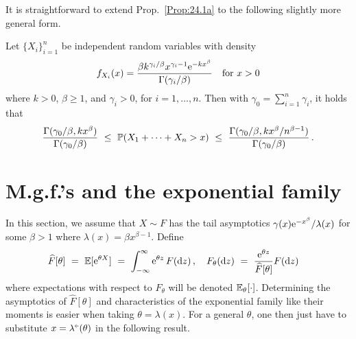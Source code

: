 It is straightforward to extend Prop.~\ref{Prop:24.1a} to the following slightly more general form.
\begin{proposition}\label{Prop:24.1b} Let $\{X_i\}_{i=1}^n$ be independent random variables with
density 
\[ f_{X_i}(x) = \frac{ \beta k^{\gamma_i/\beta} x^{\gamma_i-1}\mathrm{e}^{-kx^\beta} } { \Gamma(\gamma_i/\beta) } \quad \text{for }x>0 \]
where $k>0$, $\beta\geq 1$, and $\gamma_i>0$, for $i=1,\dots,n$. Then with $\gamma_0=\sum_{i=1}^n \gamma_i$, it holds that
\[ \frac{\Gamma(\gamma_0/\beta,kx^\beta)}{\Gamma(\gamma_0/\beta)}
\ \le\ \operatorname{{\mathbb P}}(X_1 + \cdots + X_n > x)\ \le \
\frac{\Gamma(\gamma_0/\beta,kx^\beta/n^{\beta-1})}{\Gamma(
\gamma_0/\beta)}\,.\]
\end{proposition}


\section{M.g.f.'s and the exponential family}\label{S:ExpFam}

In this section, we assume that $X \sim F$ has the tail asymptotics $\gamma(x)\mathrm{e}^{-x^\beta}/\lambda(x)$ for some $\beta>1$ where $\lambda(x)=\beta x^{\beta-1}$.
Define
\begin{align*}
\widehat F[\theta]\ &=\ \operatorname{{\mathbb E}} [\mathrm{e}^{\theta X}]\ =\
\int_{-\infty}^\infty \mathrm{e}^{\theta z}\, F(\mathrm{d} z)\,,\quad
F_\theta(\mathrm{d} z)\ =\ \frac{\mathrm{e}^{\theta z}}{\widehat F[\theta]}F(\mathrm{d} z)
\end{align*}
where expectations with respect to $F_\theta$ will be denoted $\operatorname{{\mathbb E}}_\theta[\cdot]$.
Determining the asymptotics of $\widehat F[\theta]$ and characteristics of the exponential family
like their moments is easier when taking $\theta=\lambda(x)$. For a general $\theta$, one then
just have to substitute $x=\lambda^{\ginv}(\theta)$ in the following result.


